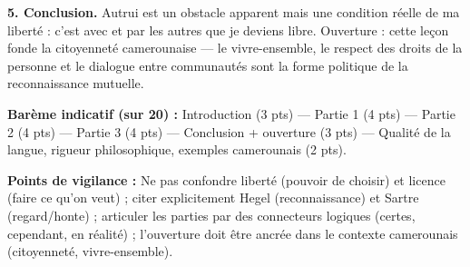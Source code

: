 \documentclass[11pt]{article}
\begin{document}
\begin{corrige}
\textbf{5. Conclusion.} Autrui est un obstacle apparent mais une condition réelle de ma liberté : c'est avec et par les autres que je deviens libre. Ouverture : cette leçon fonde la citoyenneté camerounaise — le vivre-ensemble, le respect des droits de la personne et le dialogue entre communautés sont la forme politique de la reconnaissance mutuelle.

\textbf{Barème indicatif (sur 20) :} Introduction (3 pts) — Partie 1 (4 pts) — Partie 2 (4 pts) — Partie 3 (4 pts) — Conclusion + ouverture (3 pts) — Qualité de la langue, rigueur philosophique, exemples camerounais (2 pts).

\textbf{Points de vigilance :} Ne pas confondre liberté (pouvoir de choisir) et licence (faire ce qu'on veut) ; citer explicitement Hegel (reconnaissance) et Sartre (regard/honte) ; articuler les parties par des connecteurs logiques (certes, cependant, en réalité) ; l'ouverture doit être ancrée dans le contexte camerounais (citoyenneté, vivre-ensemble).
\end{corrige}
\end{document}
